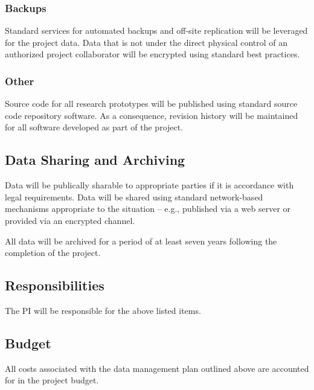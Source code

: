 \documentclass[letterpaper,twoside,11pt,headings=small]{scrartcl}
\begin{document}
\subsubsection*{Backups}

Standard services for automated backups and off-site replication will be
leveraged for the project data.  Data that is not under the direct physical
control of an authorized project collaborator will be encrypted using standard
best practices.

\subsubsection*{Other}

Source code for all research prototypes will be published using standard
source code repository software.  As a consequence, revision history will
be maintained for all software developed as part of the project.

\subsection{Data Sharing and Archiving}

Data will be publically sharable to appropriate parties if it is accordance
with legal requirements.  Data will be shared using standard network-based
mechanisms appropriate to the situation -- e.g., published via a web server
or provided via an encrypted channel.

All data will be archived for a period of at least seven years following
the completion of the project.

\subsection{Responsibilities}

The PI will be responsible for the above listed items.

\subsection{Budget}

All costs associated with the data management plan outlined above are
accounted for in the project budget.
\end{document}
